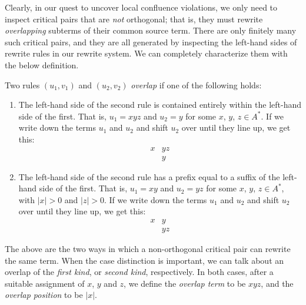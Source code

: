 \documentclass[../generics]{subfiles}
\begin{document}
Clearly, in our quest to uncover local confluence violations, we only need to inspect critical pairs that are \emph{not} orthogonal; that is, they must rewrite \emph{overlapping} subterms of their common source term. There are only finitely many such critical pairs, and they are all generated by inspecting the left-hand sides of rewrite rules in our rewrite system. We can completely characterize them with the below definition.
\begin{definition}\label{overlappingrules}
Two rules $(u_1, v_1)$ and $(u_2, v_2)$ \emph{overlap} if one of the following holds:
\begin{enumerate}
\item The left-hand side of the second rule is contained entirely within the left-hand side of the first. That is, $u_1=xyz$ and $u_2=y$ for some $x$, $y$, $z\in A^*$. If we write down the terms $u_1$ and $u_2$ and shift $u_2$ over until they line up, we get this:
\begin{align*}
x&yz\\
&y
\end{align*}
\item The left-hand side of the second rule has a prefix equal to a suffix of the left-hand side of the first. That is, $u_1=xy$ and $u_2=yz$ for some $x$, $y$, $z\in A^*$, with $|x|>0$ and $|z|>0$. If we write down the terms $u_1$ and $u_2$ and shift $u_2$ over until they line up, we get this:
\begin{align*}
x&y\\
&yz
\end{align*}
\end{enumerate}
The above are the two ways in which a non-orthogonal critical pair can rewrite the same term. When the case distinction is important, we can talk about an overlap of the \emph{first kind}, or \emph{second kind}, respectively. In both cases, after a suitable assignment of $x$, $y$ and $z$, we define the \emph{overlap term} to be $xyz$, and the \emph{overlap position} to be $|x|$.
\end{definition}
\end{document}
